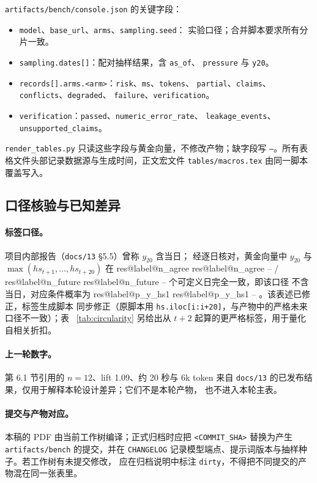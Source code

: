 \documentclass[UTF8,fontset=fandol,11pt,a4paper]{ctexart}
\makeatletter
\newcommand{\RESULT}[2]{%
  \ifcsname res@#1@#2\endcsname
    \csname res@#1@#2\endcsname
  \else
    --%
  \fi}
\makeatother
\begin{document}
\texttt{artifacts/bench/console.json} 的关键字段：
\begin{itemize}
  \item \texttt{model}、\texttt{base\_url}、\texttt{arms}、\texttt{sampling.seed}：
        实验口径；合并脚本要求所有分片一致。
  \item \texttt{sampling.dates[]}：配对抽样结果，含 \texttt{as\_of}、
        \texttt{pressure} 与 \texttt{y20}。
  \item \texttt{records[].arms.<arm>}：\texttt{risk}、\texttt{ms}、\texttt{tokens}、
        \texttt{partial}、\texttt{claims}、\texttt{conflicts}、\texttt{degraded}、
        \texttt{failure}、\texttt{verification}。
  \item \texttt{verification}：\texttt{passed}、\texttt{numeric\_error\_rate}、
        \texttt{leakage\_events}、\texttt{unsupported\_claims}。
\end{itemize}
\texttt{render\_tables.py} 只读这些字段与黄金向量，不修改产物；缺字段写
\texttt{--}。所有表格文件头部记录数据源与生成时间，正文宏文件
\texttt{tables/macros.tex} 由同一脚本覆盖写入。

\subsection{口径核验与已知差异}

\paragraph{标签口径。} 项目内部报告（\texttt{docs/13} §5.5）曾称 $y_{20}$ 含当日；
经逐日核对，黄金向量中 $y_{20}$ 与 $\max(hs_{t+1},\dots,hs_{t+20})$ 在
\RESULT{label}{n_agree}/\RESULT{label}{n_future} 个可定义日完全一致，即该口径
不含当日，对应条件概率为 \RESULT{label}{p_y_hs1}。该表述已修正，标签生成脚本
同步修正（原脚本用 \texttt{hs.iloc[i:i+20]}，与产物中的严格未来口径不一致）；表~
\ref{tab:circularity} 另给出从 $t+2$ 起算的更严格标签，用于量化自相关折扣。

\paragraph{上一轮数字。} 第 6.1 节引用的 $n=12$、lift 1.09、约 20 秒与 6k token
来自 \texttt{docs/13} 的已发布结果，仅用于解释本轮设计差异；它们不是本轮产物，
也不进入本轮主表。

\paragraph{提交与产物对应。} 本稿的 PDF 由当前工作树编译；正式归档时应把
\texttt{<COMMIT\_SHA>} 替换为产生 \texttt{artifacts/bench} 的提交，并在
\texttt{CHANGELOG} 记录模型端点、提示词版本与抽样种子。若工作树有未提交修改，
应在归档说明中标注 \texttt{dirty}，不得把不同提交的产物混在同一张表里。
\end{document}
